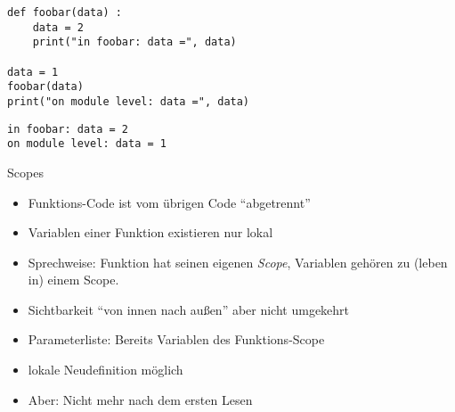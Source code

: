 \begin{frame}[fragile]
\begin{tcolorbox}[title=Speicherbild]
\begin{center}
\end{center}
\end{tcolorbox}
%
\end{frame}


\begin{frame}[fragile]
%
\begin{codebox}
\begin{verbatim}
def foobar(data) :
    data = 2
    print("in foobar: data =", data)

data = 1
foobar(data)
print("on module level: data =", data)
\end{verbatim}
\end{codebox}

\begin{cmdbox}
\begin{verbatim}
in foobar: data = 2
on module level: data = 1
\end{verbatim}
\end{cmdbox}
%
\end{frame}


\begin{frame}{Scopes}
%
\begin{itemize}
\item Funktions-Code ist vom übrigen Code \enquote{abgetrennt}
\item Variablen einer Funktion existieren nur lokal
\item Sprechweise: Funktion hat seinen eigenen \emph{Scope}, Variablen gehören zu (leben in) einem Scope.
\item Sichtbarkeit \enquote{von innen nach außen} aber nicht umgekehrt
\item Parameterliste: Bereits Variablen des Funktions-Scope
\item lokale Neudefinition möglich
\item Aber: Nicht mehr nach dem ersten Lesen
\end{itemize}
%
\end{frame}

